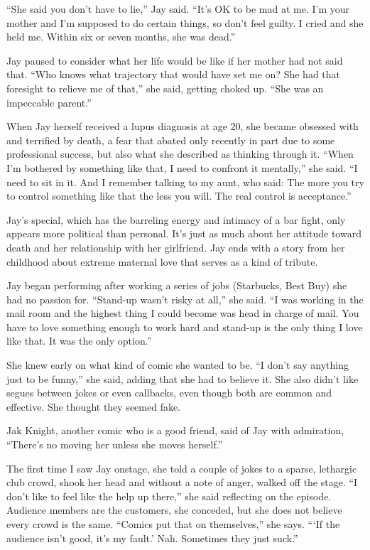 ``She said you don't have to lie,'' Jay said. ``It's OK to be mad at me.
I'm your mother and I'm supposed to do certain things, so don't feel
guilty. I cried and she held me. Within six or seven months, she was
dead.''

Jay paused to consider what her life would be like if her mother had not
said that. ``Who knows what trajectory that would have set me on? She
had that foresight to relieve me of that,'' she said, getting choked up.
``She was an impeccable parent.''

When Jay herself received a lupus diagnosis at age 20, she became
obsessed with and terrified by death, a fear that abated only recently
in part due to some professional success, but also what she described as
thinking through it. ``When I'm bothered by something like that, I need
to confront it mentally,'' she said. ``I need to sit in it. And I
remember talking to my aunt, who said: The more you try to control
something like that the less you will. The real control is acceptance.''

Jay's special, which has the barreling energy and intimacy of a bar
fight, only appears more political than personal. It's just as much
about her attitude toward death and her relationship with her
girlfriend. Jay ends with a story from her childhood about extreme
maternal love that serves as a kind of tribute.

Jay began performing after working a series of jobs (Starbucks, Best
Buy) she had no passion for. ``Stand-up wasn't risky at all,'' she said.
``I was working in the mail room and the highest thing I could become
was head in charge of mail. You have to love something enough to work
hard and stand-up is the only thing I love like that. It was the only
option.''

She knew early on what kind of comic she wanted to be. ``I don't say
anything just to be funny,'' she said, adding that she had to believe
it. She also didn't like segues between jokes or even callbacks, even
though both are common and effective. She thought they seemed fake.

Jak Knight, another comic who is a good friend, said of Jay with
admiration, ``There's no moving her unless she moves herself.''

The first time I saw Jay onstage, she told a couple of jokes to a
sparse, lethargic club crowd, shook her head and without a note of
anger, walked off the stage. ``I don't like to feel like the help up
there,'' she said reflecting on the episode. Audience members are the
customers, she conceded, but she does not believe every crowd is the
same. ``Comics put that on themselves,'' she says. ```If the audience
isn't good, it's my fault.' Nah. Sometimes they just suck.''

